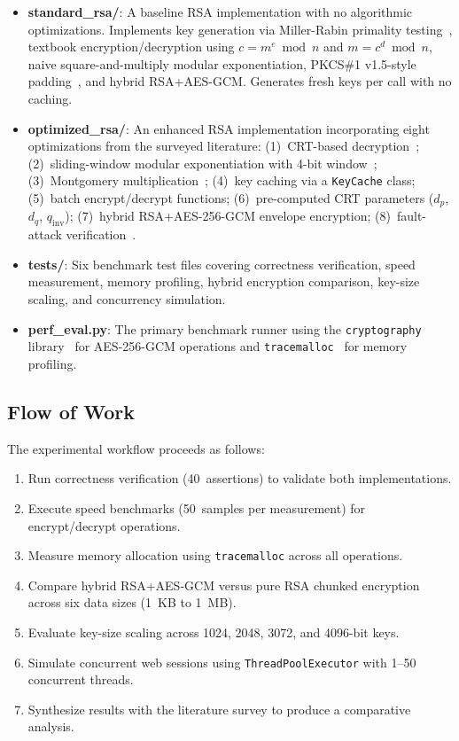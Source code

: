 \documentclass[journal]{IEEEtran}
\begin{document}
\begin{itemize}
    \item \textbf{standard\_rsa/}: A baseline RSA implementation with no algorithmic optimizations. Implements key generation via Miller-Rabin primality testing~\cite{menezes2001}, textbook encryption/decryption using $c = m^e \bmod n$ and $m = c^d \bmod n$, naive square-and-multiply modular exponentiation, PKCS\#1 v1.5-style padding~\cite{pkcs1_2016}, and hybrid RSA+AES-GCM. Generates fresh keys per call with no caching.

    \item \textbf{optimized\_rsa/}: An enhanced RSA implementation incorporating eight optimizations from the surveyed literature: (1)~CRT-based decryption~\cite{quisquater1982}; (2)~sliding-window modular exponentiation with 4-bit window~\cite{knuth1997}; (3)~Montgomery multiplication~\cite{montgomery1985}; (4)~key caching via a \texttt{KeyCache} class; (5)~batch encrypt/decrypt functions; (6)~pre-computed CRT parameters ($d_p$, $d_q$, $q_{\mathrm{inv}}$); (7)~hybrid RSA+AES-256-GCM envelope encryption; (8)~fault-attack verification~\cite{boneh2001}.

    \item \textbf{tests/}: Six benchmark test files covering correctness verification, speed measurement, memory profiling, hybrid encryption comparison, key-size scaling, and concurrency simulation.

    \item \textbf{perf\_eval.py}: The primary benchmark runner using the \texttt{cryptography} library~\cite{cryptography_io} for AES-256-GCM operations and \texttt{tracemalloc}~\cite{python_tracemalloc} for memory profiling.
\end{itemize}

\subsection{Flow of Work}

The experimental workflow proceeds as follows:
\begin{enumerate}
    \item Run correctness verification (40~assertions) to validate both implementations.
    \item Execute speed benchmarks (50~samples per measurement) for encrypt/decrypt operations.
    \item Measure memory allocation using \texttt{tracemalloc} across all operations.
    \item Compare hybrid RSA+AES-GCM versus pure RSA chunked encryption across six data sizes (1~KB to 1~MB).
    \item Evaluate key-size scaling across 1024, 2048, 3072, and 4096-bit keys.
    \item Simulate concurrent web sessions using \texttt{ThreadPoolExecutor} with 1--50 concurrent threads.
    \item Synthesize results with the literature survey to produce a comparative analysis.
\end{enumerate}
\end{document}
